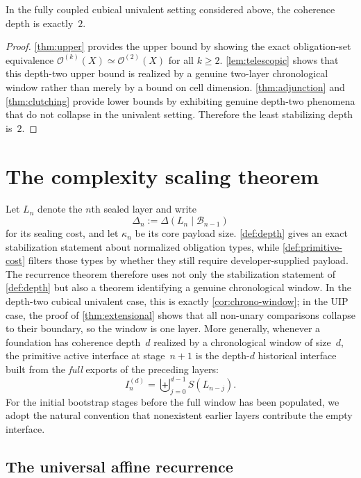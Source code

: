 \documentclass{lmcs}
\newcommand{\B}{\mathcal{B}}
\newcommand{\Ocal}{\mathcal{O}}
\begin{document}
\begin{cor}
\label{cor:d2}
In the fully coupled cubical univalent setting considered above, the coherence depth is exactly~$2$.
\end{cor}

\begin{proof}
\autoref{thm:upper} provides the upper bound by showing the exact obligation-set equivalence $\Ocal^{(k)}(X) \simeq \Ocal^{(2)}(X)$ for all $k \geq 2$. \autoref{lem:telescopic} shows that this depth-two upper bound is realized by a genuine two-layer chronological window rather than merely by a bound on cell dimension. \autoref{thm:adjunction} and \autoref{thm:clutching} provide lower bounds by exhibiting genuine depth-two phenomena that do not collapse in the univalent setting. Therefore the least stabilizing depth is~$2$.
\end{proof}

\section{The complexity scaling theorem}
\label{sec:scaling}

Let $L_n$ denote the $n$th sealed layer and write
\[
  \Delta_n := \Delta(L_n \mid \B_{n-1})
\]
for its sealing cost, and let $\kappa_n$ be its core payload size. \autoref{def:depth} gives an exact stabilization statement about normalized obligation types, while \autoref{def:primitive-cost} filters those types by whether they still require developer-supplied payload. The recurrence theorem therefore uses not only the stabilization statement of \autoref{def:depth} but also a theorem identifying a genuine chronological window. In the depth-two cubical univalent case, this is exactly \autoref{cor:chrono-window}; in the UIP case, the proof of \autoref{thm:extensional} shows that all non-unary comparisons collapse to their boundary, so the window is one layer. More generally, whenever a foundation has coherence depth~$d$ realized by a chronological window of size~$d$, the primitive active interface at stage~$n+1$ is the depth-$d$ historical interface built from the \emph{full} exports of the preceding layers:
\[
  I_n^{(d)} = \biguplus_{j=0}^{d-1} S(L_{n-j}).
\]
For the initial bootstrap stages before the full window has been populated, we adopt the natural convention that nonexistent earlier layers contribute the empty interface.

\subsection{The universal affine recurrence}
\end{document}
